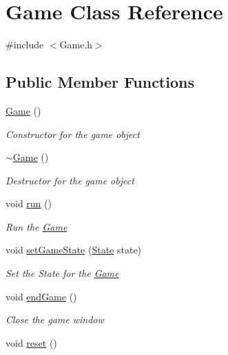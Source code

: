 \hypertarget{class_game}{}\section{Game Class Reference}
\label{class_game}


{\ttfamily \#include $<$Game.\+h$>$}

\subsection*{Public Member Functions}
\begin{DoxyCompactItemize}
\item 
\mbox{\hyperlink{class_game_ad59df6562a58a614fda24622d3715b65}{Game}} ()
\begin{DoxyCompactList}\small\item\em Constructor for the game object \end{DoxyCompactList}\item 
\mbox{\hyperlink{class_game_ae3d112ca6e0e55150d2fdbc704474530}{$\sim$\+Game}} ()
\begin{DoxyCompactList}\small\item\em Destructor for the game object \end{DoxyCompactList}\item 
void \mbox{\hyperlink{class_game_a1ab78f5ed0d5ea879157357cf2fb2afa}{run}} ()
\begin{DoxyCompactList}\small\item\em Run the \mbox{\hyperlink{class_game}{Game}} \end{DoxyCompactList}\item 
void \mbox{\hyperlink{class_game_aad5127a681fd55057a4fc717a4434bf6}{set\+Game\+State}} (\mbox{\hyperlink{_game_8h_a5d74787dedbc4e11c1ab15bf487e61f8}{State}} state)
\begin{DoxyCompactList}\small\item\em Set the State for the \mbox{\hyperlink{class_game}{Game}} \end{DoxyCompactList}\item 
void \mbox{\hyperlink{class_game_a7d88788cf4b0da39a0245d418aa6f37a}{end\+Game}} ()
\begin{DoxyCompactList}\small\item\em Close the game window \end{DoxyCompactList}\item 
void \mbox{\hyperlink{class_game_a39bb2fd26b5ea6b164f28f9f6723582e}{reset}} ()
\end{DoxyCompactItemize}


